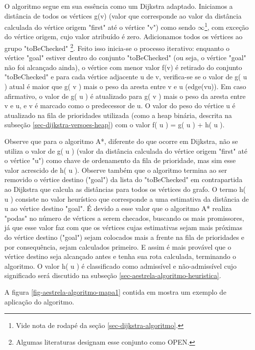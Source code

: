 O algoritmo segue em sua essência como um Dijkstra adaptado. Iniciamos a distância de todos os vértices g(v) (valor que corresponde ao valor da distância calculada do vértice origem "first" até o vértice "v") como sendo $\infty$\footnote{Vide nota de rodapé da seção \ref{sec-dijkstra-algoritmo}.}, com exceção do vértice origem, cujo valor atribuído é zero. Adicionamos todos os vértices ao grupo "toBeChecked" \footnote{Algumas literaturas designam esse conjunto como OPEN.}. Feito isso inicia-se o processo iterativo: enquanto o vértice "goal" estiver dentro do conjunto "toBeChecked" (ou seja, o vértice "goal" não foi alcançado ainda), o vértice com menor valor f(v) é retirado do conjunto "toBeChecked" e para cada vértice adjacente u de v, verifica-se se o valor de g( u ) atual é maior que g( v ) mais o peso da aresta entre v e u (edge(vu)). Em caso afirmativo, o valor de g( u ) é atualizado para g( v ) mais o peso da aresta entre v e u, e v é marcado como o predecessor de u. O valor do peso do vértice u é atualizado na fila de prioridades utilizada (como a heap binária, descrita na subseção \ref{sec-dijkstra-versoes-heap}) com o valor f( u ) = g( u ) + h( u ).

Observe que para o algoritmo A*, diferente do que ocorre em Dijkstra, não se utiliza o valor de g( u ) (valor da distância calculada do vértice origem "first" até o vértice "u") como chave de ordenamento da fila de prioridade, mas sim esse valor acrescido de h( u ). Observe também que o algoritmo termina ao ser removido o vértice destino ("goal") da lista do "toBeChecked" em contrapartida ao Dijkstra que calcula as distâncias para todos os vértices do grafo. O termo h( u ) consiste no valor heurístico que corresponde a uma estimativa da distância de u ao vértice destino "goal". É devido a esse valor que o algoritmo A* realiza "podas" no número de vértices a serem checados, buscando os mais promissores, já que esse valor faz com que os vértices cujas estimativas sejam mais próximas do vértice destino ("goal") sejam colocados mais a frente na fila de prioridades e por consequência, sejam calculados primeiro. E assim é mais provável que o vértice destino seja alcançado antes e tenha sua rota calculada, terminando o algoritmo. O valor h( u ) é classificado como admissível e não-admissível cujo significado será discutido na subseção \ref{sec-aestrela-algoritmo-heuristica}.

A figura \ref{fig-aestrela-algoritmo-mapa1} contida em  mostra um exemplo de aplicação do algoritmo.

